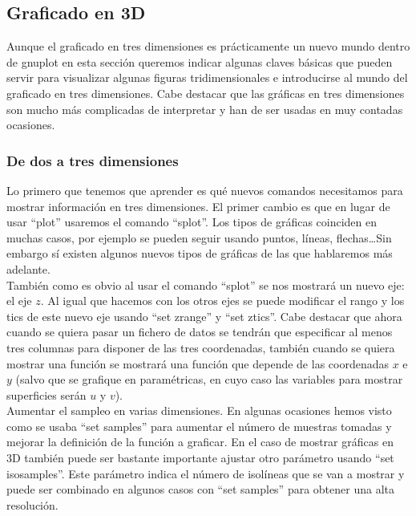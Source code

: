 \documentclass[11pt,a4paper,twoside,pdf]{article}
\numberwithin{equation}{section}
\begin{document}
\subsection{Graficado en 3D}

Aunque el graficado en tres dimensiones es prácticamente un nuevo mundo dentro de gnuplot en esta sección queremos indicar algunas claves básicas que pueden servir para visualizar algunas figuras tridimensionales e introducirse al mundo del graficado en tres dimensiones. Cabe destacar que las gráficas en tres dimensiones son mucho más complicadas de interpretar y han de ser usadas en muy contadas ocasiones.

\subsubsection{De dos a tres dimensiones}

Lo primero que tenemos que aprender es qué nuevos comandos necesitamos para mostrar información en tres dimensiones. El primer cambio es que en lugar de usar ``plot'' usaremos el comando ``splot''. Los tipos de gráficas coinciden en muchas casos, por ejemplo se pueden seguir usando puntos, líneas, flechas\ldots Sin embargo sí existen algunos nuevos tipos de gráficas de las que hablaremos más adelante. \\

También como es obvio al usar el comando ``splot'' se nos mostrará un nuevo eje: el eje $z$. Al igual que hacemos con los otros ejes se puede modificar el rango y los tics de este nuevo eje usando ``set zrange'' y ``set ztics''. Cabe destacar que ahora cuando se quiera pasar un fichero de datos se tendrán que especificar al menos tres columnas para disponer de las tres coordenadas, también cuando se quiera mostrar una función se mostrará una función que depende de las coordenadas $x$ e $y$ (salvo que se grafique en paramétricas, en cuyo caso las variables para mostrar superficies serán $u$ y $v$). \\

Aumentar el sampleo en varias dimensiones. En algunas ocasiones hemos visto como se usaba ``set samples'' para aumentar el número de muestras tomadas y mejorar la definición de la función a graficar. En el caso de mostrar gráficas en 3D también puede ser bastante importante ajustar otro parámetro usando ``set isosamples''. Este parámetro indica el número de isolíneas que se van a mostrar y puede ser combinado en algunos casos con ``set samples'' para obtener una alta resolución.
\end{document}
